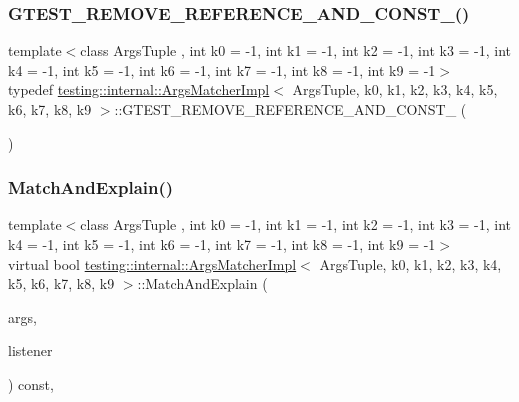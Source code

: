 \subsubsection{\texorpdfstring{GTEST\_REMOVE\_REFERENCE\_AND\_CONST\_()}{GTEST\_REMOVE\_REFERENCE\_AND\_CONST\_()}}
{\footnotesize\ttfamily template$<$class Args\+Tuple , int k0 = -\/1, int k1 = -\/1, int k2 = -\/1, int k3 = -\/1, int k4 = -\/1, int k5 = -\/1, int k6 = -\/1, int k7 = -\/1, int k8 = -\/1, int k9 = -\/1$>$ \\
typedef \mbox{\hyperlink{classtesting_1_1internal_1_1_args_matcher_impl}{testing\+::internal\+::\+Args\+Matcher\+Impl}}$<$ Args\+Tuple, k0, k1, k2, k3, k4, k5, k6, k7, k8, k9 $>$\+::G\+T\+E\+S\+T\+\_\+\+R\+E\+M\+O\+V\+E\+\_\+\+R\+E\+F\+E\+R\+E\+N\+C\+E\+\_\+\+A\+N\+D\+\_\+\+C\+O\+N\+S\+T\+\_\+ (\begin{DoxyParamCaption}\item[{Args\+Tuple}]{ }\end{DoxyParamCaption})}

\mbox{\label{classtesting_1_1internal_1_1_args_matcher_impl_a60383b3073a61f9d82cbf31fe19e6bfa}} 
\subsubsection{\texorpdfstring{MatchAndExplain()}{MatchAndExplain()}}
{\footnotesize\ttfamily template$<$class Args\+Tuple , int k0 = -\/1, int k1 = -\/1, int k2 = -\/1, int k3 = -\/1, int k4 = -\/1, int k5 = -\/1, int k6 = -\/1, int k7 = -\/1, int k8 = -\/1, int k9 = -\/1$>$ \\
virtual bool \mbox{\hyperlink{classtesting_1_1internal_1_1_args_matcher_impl}{testing\+::internal\+::\+Args\+Matcher\+Impl}}$<$ Args\+Tuple, k0, k1, k2, k3, k4, k5, k6, k7, k8, k9 $>$\+::Match\+And\+Explain (\begin{DoxyParamCaption}\item[{Args\+Tuple}]{args,  }\item[{Match\+Result\+Listener $\ast$}]{listener }\end{DoxyParamCaption}) const\hspace{0.3cm}{\ttfamily [inline]}, {\ttfamily [virtual]}}

